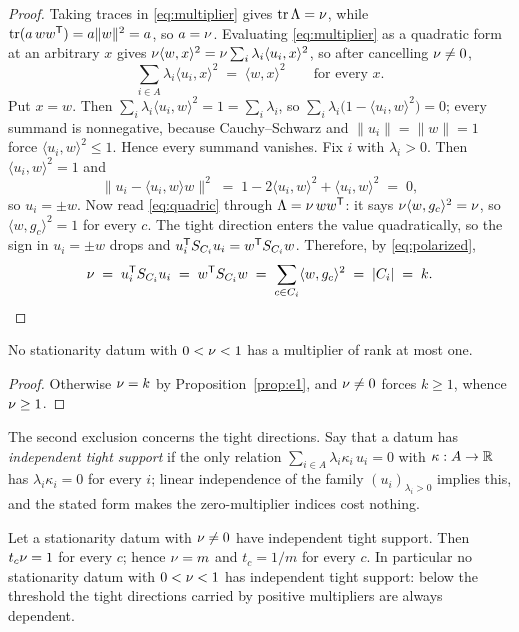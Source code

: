 \begin{proof}
Taking traces in \eqref{eq:multiplier} gives $\operatorname{tr}\Lambda=\nu$, while
$\operatorname{tr}(a\,ww^{\mathsf{T}})=a\lVert w\rVert^2=a$, so $a=\nu$.
Evaluating \eqref{eq:multiplier} as a quadratic form at an arbitrary $x$
gives $\nu\langle w,x\rangle^2=\nu\sum_i\lambda_i\langle u_i,x\rangle^2$, so
after cancelling $\nu\ne0$,
\[
  \sum_{i\in A}\lambda_i\langle u_i,x\rangle^2
  \;=\;\langle w,x\rangle^2\qquad\text{for every }x .
\]
Put $x=w$.  Then $\sum_i\lambda_i\langle u_i,w\rangle^2=1
=\sum_i\lambda_i$, so
$\sum_i\lambda_i\bigl(1-\langle u_i,w\rangle^2\bigr)=0$; every summand is
nonnegative, because Cauchy--Schwarz and
$\lVert u_i\rVert=\lVert w\rVert=1$ force
$\langle u_i,w\rangle^2\le1$.  Hence every summand vanishes.  Fix $i$
with $\lambda_i>0$.  Then $\langle u_i,w\rangle^2=1$ and
\[
  \bigl\lVert u_i-\langle u_i,w\rangle w\bigr\rVert^2
  \;=\;1-2\langle u_i,w\rangle^2+\langle u_i,w\rangle^2\;=\;0 ,
\]
so $u_i=\pm w$.  Now read \eqref{eq:quadric} through $\Lambda=\nu\,ww^{\mathsf{T}}$:
it says $\nu\langle w,g_c\rangle^2=\nu$, so $\langle w,g_c\rangle^2=1$ for
every $c$.  The tight direction enters the value quadratically, so the
sign in $u_i=\pm w$ drops and $u_i^{\mathsf{T}} S_{C_i}u_i=w^{\mathsf{T}} S_{C_i}w$.
Therefore, by \eqref{eq:polarized},
\[
  \nu\;=\;u_i^{\mathsf{T}} S_{C_i}u_i\;=\;w^{\mathsf{T}} S_{C_i}w
    \;=\;\sum_{c\in C_i}\langle w,g_c\rangle^2
    \;=\;\lvert C_i\rvert\;=\;k. \qedhere
\]
\end{proof}

\begin{corollary}[Lean]\label{cor:e1}
No stationarity datum with $0<\nu<1$ has a multiplier of rank at most one.
\end{corollary}

\begin{proof}
Otherwise $\nu=k$ by Proposition~\ref{prop:e1}, and $\nu\ne0$ forces
$k\ge1$, whence $\nu\ge1$.
\end{proof}

The second exclusion concerns the tight directions.  Say that a datum has
\emph{independent tight support} if the only relation
$\sum_{i\in A}\lambda_i\kappa_i\,u_i=0$ with $\kappa:A\to\mathbb{R}$ has
$\lambda_i\kappa_i=0$ for every $i$; linear independence of the family
$(u_i)_{\lambda_i>0}$ implies this, and the stated form makes the
zero-multiplier indices cost nothing.

\begin{proposition}[Lean]\label{prop:e2}
Let a stationarity datum with $\nu\ne0$ have independent tight support.
Then $t_c\nu=1$ for every $c$; hence $\nu=m$ and $t_c=1/m$ for every $c$.
In particular no stationarity datum with $0<\nu<1$ has independent tight
support: below the threshold the tight directions carried by positive
multipliers are always dependent.
\end{proposition}

